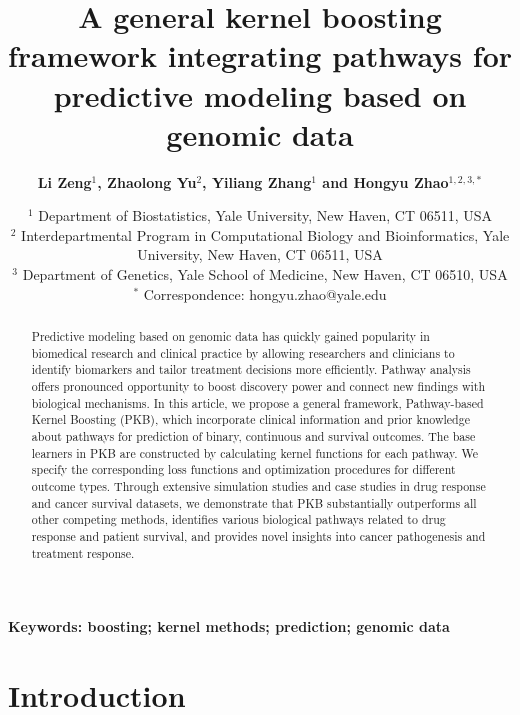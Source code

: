 \documentclass[a4paper,12pt]{article}
\begin{document}
	\title{\bf A general kernel boosting framework integrating pathways for predictive modeling based on genomic data}
	\author{\bf Li Zeng$^{1}$, Zhaolong Yu$^2$, Yiliang Zhang$^1$ and Hongyu Zhao$^{1,2,3,*}$}
	\date{
		$^1$ Department of Biostatistics, Yale University, New Haven, CT 06511, USA\\
	$^2$ Interdepartmental Program in Computational Biology and Bioinformatics, Yale University, New Haven, CT 06511, USA\\
	$^3$ Department of Genetics, Yale School of Medicine, New Haven, CT 06510, USA\\
	$^*$ Correspondence: hongyu.zhao@yale.edu
}
	\maketitle
	\begin{abstract}
Predictive modeling based on genomic data has quickly gained popularity in biomedical research and clinical practice by allowing researchers and clinicians to identify biomarkers and tailor treatment decisions more efficiently. Pathway analysis offers pronounced opportunity to boost discovery power and connect new findings with biological mechanisms. In this article, we propose a general framework, Pathway-based Kernel Boosting (PKB), which incorporate clinical information and prior knowledge about pathways for prediction of binary, continuous and survival outcomes. The base learners in PKB are constructed by calculating kernel functions for each pathway. We specify the corresponding loss functions and optimization procedures for different outcome types. Through extensive simulation studies and case studies in drug response and cancer survival datasets, we demonstrate that PKB substantially outperforms all other competing methods, identifies various biological pathways related to drug response and patient survival, and provides novel insights into cancer pathogenesis and treatment response.
		\end{abstract}

		\begin{center}
			\textbf{Keywords: boosting; kernel methods; prediction; genomic data}
			\end{center}

	

	\section{Introduction}
\end{document}
